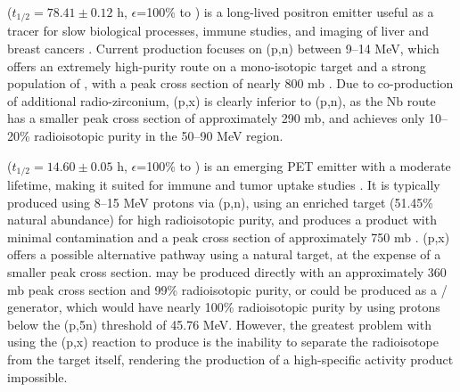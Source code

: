 \documentclass[3p]{elsarticle}
\begin{document}
 ($t_{1/2}=78.41\pm0.12$ h, $\epsilon$=100\% to   \cite{Singh2013}) is a long-lived positron emitter useful as a tracer for slow biological processes, immune studies, and imaging of liver and  breast cancers \cite{Verel2003,Dijkers2009,Dijkers2010}.
Current production focuses on (p,n) between 9--14 MeV, which offers an extremely high-purity route on a mono-isotopic target and a strong population of , with a peak cross section of nearly 800 mb   \cite{PhysRevC.38.1624,Omara2009}.
Due to co-production of additional  radio-zirconium,  (p,x) is clearly inferior to  (p,n), as the Nb route has a smaller peak cross section of approximately 290 mb, and achieves only 10--20\% radioisotopic purity in the 50--90 MeV region.




 ($t_{1/2}=14.60 \pm 0.05$ h, $\epsilon$=100\% to   \cite{Browne1997}) is an emerging PET emitter with a moderate lifetime, making it suited for immune and tumor uptake studies    \cite{Busse2002,Radchenko2012}.
It is typically produced using 8--15 MeV protons via (p,n), using an enriched target (51.45\% natural abundance) for high radioisotopic purity, and produces a product with minimal contamination and a peak cross section of approximately 750 mb  \cite{Busse2002}.
(p,x) offers a possible alternative pathway using a natural target, at the expense of a smaller peak cross section.
 may be produced directly with an approximately 360 mb peak cross section and 99\% radioisotopic purity, or could be produced as a / generator, which would have nearly 100\% radioisotopic purity by using protons below the (p,5n) threshold of 45.76 MeV.
However, the greatest problem with using the (p,x) reaction to produce  is the inability to separate the radioisotope from the target itself, rendering the production of a high-specific activity product impossible.  
\end{document}
